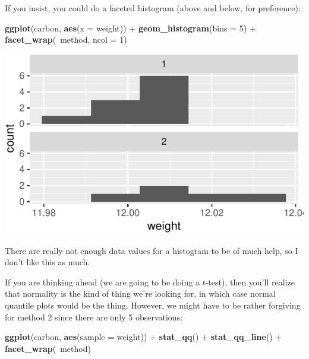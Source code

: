 \documentclass[]{tufte-book}
\newenvironment{Shaded}{}{}
\newcommand{\DataTypeTok}[1]{\textcolor[rgb]{0.56,0.13,0.00}{#1}}
\newcommand{\DecValTok}[1]{\textcolor[rgb]{0.25,0.63,0.44}{#1}}
\newcommand{\KeywordTok}[1]{\textcolor[rgb]{0.00,0.44,0.13}{\textbf{#1}}}
\newcommand{\NormalTok}[1]{#1}
\newcommand{\OperatorTok}[1]{\textcolor[rgb]{0.40,0.40,0.40}{#1}}
\newcommand{\StringTok}[1]{\textcolor[rgb]{0.25,0.44,0.63}{#1}}
\theoremstyle{definition}
\theoremstyle{definition}
\theoremstyle{definition}
\theoremstyle{remark}
\begin{document}
If you insist, you could do a faceted histogram (above and below, for
preference):

\begin{Shaded}
\begin{Highlighting}[]
\KeywordTok{ggplot}\NormalTok{(carbon, }\KeywordTok{aes}\NormalTok{(}\DataTypeTok{x =}\NormalTok{ weight)) }\OperatorTok{+}\StringTok{ }\KeywordTok{geom_histogram}\NormalTok{(}\DataTypeTok{bins =} \DecValTok{5}\NormalTok{) }\OperatorTok{+}\StringTok{ }
\StringTok{    }\KeywordTok{facet_wrap}\NormalTok{(}\OperatorTok{~}\NormalTok{method, }\DataTypeTok{ncol =} \DecValTok{1}\NormalTok{)}
\end{Highlighting}
\end{Shaded}

\includegraphics{10-analysis-of-variance_files/figure-latex/unnamed-chunk-53-1}

There are really not enough data values for a histogram to be of much
help, so I don't like this as much.

If you are thinking ahead (we are going to be doing a \(t\)-test), then
you'll realize that normality is the kind of thing we're looking for, in
which case normal quantile plots would be the thing. However, we might
have to be rather forgiving for method 2 since there are only 5
observations:

\begin{Shaded}
\begin{Highlighting}[]
\KeywordTok{ggplot}\NormalTok{(carbon, }\KeywordTok{aes}\NormalTok{(}\DataTypeTok{sample =}\NormalTok{ weight)) }\OperatorTok{+}\StringTok{ }\KeywordTok{stat_qq}\NormalTok{() }\OperatorTok{+}\StringTok{ }
\StringTok{    }\KeywordTok{stat_qq_line}\NormalTok{() }\OperatorTok{+}\StringTok{ }\KeywordTok{facet_wrap}\NormalTok{(}\OperatorTok{~}\NormalTok{method)}
\end{Highlighting}
\end{Shaded}
\end{document}

